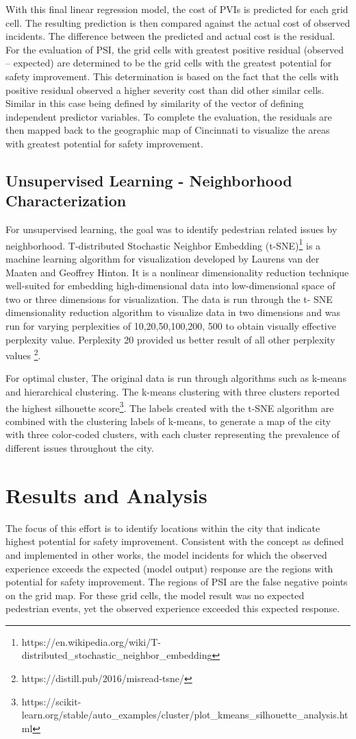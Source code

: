 \documentclass{llncs}
\begin{document}
With this final linear regression model, the cost of PVIs is predicted for each grid cell. The resulting prediction is then compared against the actual cost of observed incidents. The difference between the predicted and actual cost is the residual. For the evaluation of PSI, the grid cells with greatest positive residual (observed – expected) are determined to be the grid cells with the greatest potential for safety improvement. This determination is based on the fact that the cells with positive residual observed a higher severity cost than did other similar cells. Similar in this case being defined by similarity of the vector of defining independent predictor variables. To complete the evaluation, the residuals are then mapped back to the geographic map of Cincinnati to visualize the areas with greatest potential for safety improvement.

\subsection{Unsupervised Learning - Neighborhood Characterization}
For unsupervised learning, the goal was to identify pedestrian related issues by neighborhood. T-distributed Stochastic Neighbor Embedding (t-SNE)\footnote{https://en.wikipedia.org/wiki/T-distributed_stochastic_neighbor_embedding} is a machine learning algorithm for visualization developed by Laurens van der Maaten and Geoffrey Hinton. It is a nonlinear dimensionality reduction technique well-suited for embedding high-dimensional data into low-dimensional space of two or three dimensions  for visualization. The data is run through the t- SNE dimensionality reduction algorithm to visualize data in two dimensions and was run for varying perplexities of 10,20,50,100,200, 500 to obtain visually effective perplexity value. Perplexity 20 provided us better result of all other perplexity values \footnote{https://distill.pub/2016/misread-tsne/}.

For optimal cluster, The original data is run through algorithms such as k-means and hierarchical clustering. The k-means clustering with three clusters reported the highest silhouette score\footnote{https://scikit-learn.org/stable/auto_examples/cluster/plot_kmeans_silhouette_analysis.html}. The labels created with the t-SNE algorithm are combined with the clustering labels of k-means, to generate a map of the city with three color-coded clusters, with each cluster representing the prevalence of different issues throughout the city. 

%
\section{Results and Analysis}
%
The focus of this effort is to identify locations within the city that indicate highest potential for safety improvement. Consistent with the concept as defined and implemented in other works, the model incidents for which the observed experience exceeds the expected (model output) response are the regions with potential for safety improvement. The regions of PSI are the false negative points on the grid map. For these grid cells, the model result was no expected pedestrian events, yet the observed experience exceeded this expected response.
\end{document}
